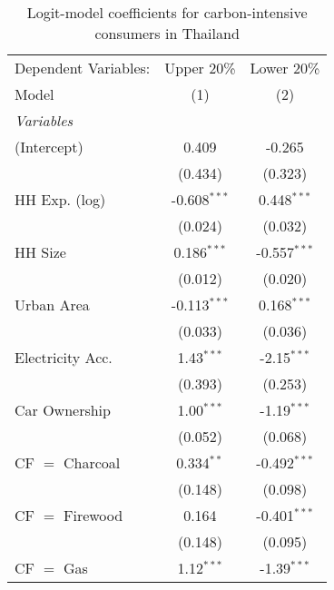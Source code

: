 
\begin{table}[htbp!]
   \centering
   \small
   \begin{adjustbox}{width = 1\textwidth, max height = 0.95\textheight, center}
      \begin{threeparttable}[b]
         \caption{\label{tab:Logit_1_THA} Logit-model coefficients for carbon-intensive consumers in Thailand}
         \begin{tabular}{lcc}
            \tabularnewline \midrule \midrule
            Dependent Variables: & Upper 20\%     & Lower 20\%\\   
            Model                & (1)            & (2)\\  
            \midrule
            \emph{Variables}\\
            (Intercept)          & 0.409          & -0.265\\   
                                 & (0.434)        & (0.323)\\   
            HH Exp. (log)        & -0.608$^{***}$ & 0.448$^{***}$\\   
                                 & (0.024)        & (0.032)\\   
            HH Size              & 0.186$^{***}$  & -0.557$^{***}$\\   
                                 & (0.012)        & (0.020)\\   
            Urban Area           & -0.113$^{***}$ & 0.168$^{***}$\\   
                                 & (0.033)        & (0.036)\\   
            Electricity Acc.     & 1.43$^{***}$   & -2.15$^{***}$\\   
                                 & (0.393)        & (0.253)\\   
            Car Ownership        & 1.00$^{***}$   & -1.19$^{***}$\\   
                                 & (0.052)        & (0.068)\\   
            CF $=$ Charcoal      & 0.334$^{**}$   & -0.492$^{***}$\\   
                                 & (0.148)        & (0.098)\\   
            CF $=$ Firewood      & 0.164          & -0.401$^{***}$\\   
                                 & (0.148)        & (0.095)\\   
            CF $=$ Gas           & 1.12$^{***}$   & -1.39$^{***}$\\   

\end{tabular}
\end{threeparttable}
\end{adjustbox}
\end{table}
